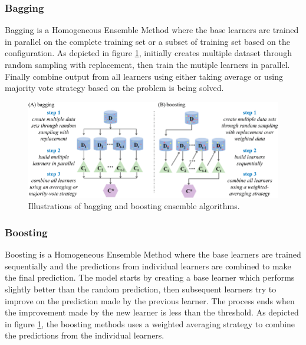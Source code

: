 \documentclass[twoside,11pt,a4paper]{article}
\begin{document}
\subsubsection{Bagging}
Bagging is a Homogeneous Ensemble Method where the base learners are trained in parallel on the complete training set or a subset of training set based on the configuration. As depicted in figure \ref{fig:bagging_boosting}, initially creates multiple dataset through random sampling with replacement, then train the mutiple learners in parallel. Finally combine output from all learners using either taking average or using majority vote strategy based on the problem is being solved. \\
\begin{figure}[ht]
	\centering
	\includegraphics[width=1\textwidth]{bagging_boosting}
	\caption[Illustrations of bagging and boosting ensemble algorithms.]{Illustrations of bagging and boosting ensemble algorithms\citep{yang2019concepts}.}
	\label{fig:bagging_boosting}
\end{figure}
\FloatBarrier
\subsubsection{Boosting}
Boosting is a Homogeneous Ensemble Method where the base learners are trained sequentially and the predictions from individual learners are combined to make the final prediction. The model starts by creating a base learner which performs slightly better than the random prediction, then subsequent learners try to improve on the prediction made by the previous learner. The process ends when the improvement made by the new learner is less than the threshold. As depicted in figure \ref{fig:bagging_boosting}, the boosting methods uses a weighted averaging strategy to combine the predictions from the individual learners. 
\end{document}
